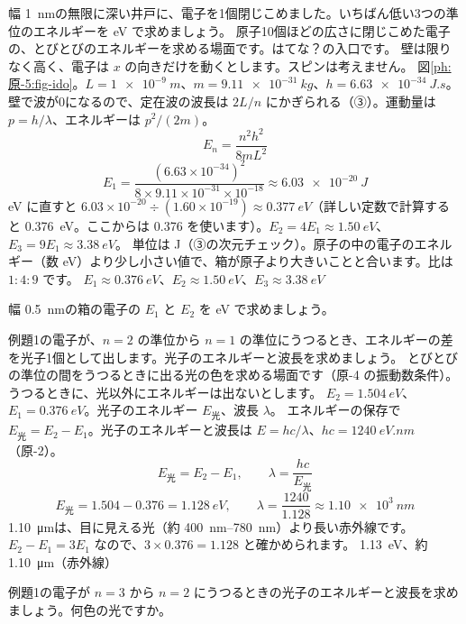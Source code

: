 \label{ph:原-5:ex1}
\begin{phreidai}[幅 1 nm の箱の電子]
幅 \qty{1}{nm}の無限に深い井戸に、電子を1個閉じこめました。いちばん低い3つの準位のエネルギーを eV で求めましょう。
\phbamen
原子10個ほどの広さに閉じこめた電子の、とびとびのエネルギーを求める場面です。はてな？の入口です。
\phmushi
壁は限りなく高く、電子は $x$ の向きだけを動くとします。スピンは考えません。
\phzu
図\ref{ph:原-5:fig-ido}。$L=\qty{1e-9}{m}$、$m=\qty{9.11e-31}{kg}$、$h=\qty{6.63e-34}{J.s}$。
\phriyu
壁で波が0になるので、定在波の波長は $2L/n$ にかぎられる（③）。運動量は $p=h/\lambda$、エネルギーは $p^2/(2m)$。
\phtateru
\[E_n=\frac{n^2h^2}{8mL^2}\]
\phtoku
\[E_1=\frac{(6.63\times10^{-34})^2}{8\times9.11\times10^{-31}\times10^{-18}}\approx\qty{6.03e-20}{J}\]
eV に直すと $6.03\times10^{-20}\div(1.60\times10^{-19})\approx\qty{0.377}{eV}$（詳しい定数で計算すると \qty{0.376}{eV}。ここからは 0.376 を使います）。$E_2=4E_1\approx\qty{1.50}{eV}$、$E_3=9E_1\approx\qty{3.38}{eV}$。
\phtashikame
単位は J（③の次元チェック）。原子の中の電子のエネルギー（数 eV）より少し小さい値で、箱が原子より大きいことと合います。比は $1:4:9$ です。
\kotae $E_1\approx\qty{0.376}{eV}$、$E_2\approx\qty{1.50}{eV}$、$E_3\approx\qty{3.38}{eV}$
\end{phreidai}
\begin{jibun}
幅 \qty{0.5}{nm}の箱の電子の $E_1$ と $E_2$ を eV で求めましょう。
\end{jibun}

\label{ph:原-5:ex2}
\begin{phreidai}[箱の電子が出す光]
例題1の電子が、$n=2$ の準位から $n=1$ の準位にうつるとき、エネルギーの差を光子1個として出します。光子のエネルギーと波長を求めましょう。
\phbamen
とびとびの準位の間をうつるときに出る光の色を求める場面です（原-4 の振動数条件）。
\phmushi
うつるときに、光以外にエネルギーは出ないとします。
\phzu
$E_2=\qty{1.504}{eV}$、$E_1=\qty{0.376}{eV}$。光子のエネルギー $E_{\text{光}}$、波長 $\lambda$。
\phriyu
エネルギーの保存で $E_{\text{光}}=E_2-E_1$。光子のエネルギーと波長は $E=hc/\lambda$、$hc=\qty{1240}{eV.nm}$（原-2）。
\phtateru
\[E_{\text{光}}=E_2-E_1,\qquad \lambda=\frac{hc}{E_{\text{光}}}\]
\phtoku
\[E_{\text{光}}=1.504-0.376=\qty{1.128}{eV},\qquad \lambda=\frac{1240}{1.128}\approx\qty{1.10e3}{nm}\]
\phtashikame
\qty{1.10}{\micro m}は、目に見える光（約 \qtyrange{400}{780}{nm}）より長い赤外線です。$E_2-E_1=3E_1$ なので、$3\times0.376=1.128$ と確かめられます。
\kotae \qty{1.13}{eV}、約 \qty{1.10}{\micro m}（赤外線）
\end{phreidai}
\begin{jibun}
例題1の電子が $n=3$ から $n=2$ にうつるときの光子のエネルギーと波長を求めましょう。何色の光ですか。
\end{jibun}

